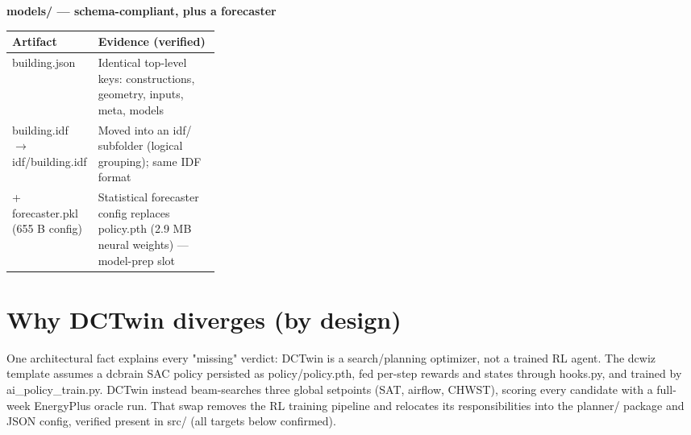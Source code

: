 \documentclass[10pt]{article}
\begin{document}
\smallskip\noindent\textbf{models/\allowbreak{} — schema-compliant, plus a forecaster}\\[1pt]
\vspace{1pt}\begin{tabularx}{\linewidth}{@{}p{0.30\linewidth} X@{}}
\toprule
\textbf{Artifact} & \textbf{Evidence (verified)} \\
\midrule
building.json & Identical top-level keys: constructions, geometry, inputs, meta, models \\
building.idf $\rightarrow$ idf/\allowbreak{}building.idf & Moved into an idf/\allowbreak{} subfolder (logical grouping); same IDF format \\
+ forecaster.pkl (655 B config) & Statistical forecaster config replaces policy.pth (2.9 MB neural weights) — model-prep slot \\
\bottomrule
\end{tabularx}\vspace{2pt}

\section*{Why DCTwin diverges (by design)}
One architectural fact explains every "missing" verdict: DCTwin is a search/\allowbreak{}planning optimizer, not a trained RL agent. The dcwiz template assumes a dcbrain SAC policy persisted as policy/\allowbreak{}policy.pth, fed per-step rewards and states through hooks.py, and trained by ai\_\allowbreak{}policy\_\allowbreak{}train.py. DCTwin instead beam-searches three global setpoints (SAT, airflow, CHWST), scoring every candidate with a full-week EnergyPlus oracle run. That swap removes the RL training pipeline and relocates its responsibilities into the planner/\allowbreak{} package and JSON config, verified present in src/\allowbreak{} (all targets below confirmed).
\end{document}
